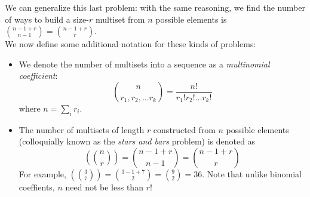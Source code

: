 \documentclass[11pt,twosided]{article}
\newcommand{\snb}[2]{\left(\binom{#1}{#2}\right)}
\begin{document}
\newline
We can generalize this last problem: with the same reasoning, we find the number of ways to build a size-$r$ multiset from $n$ possible elements is $\binom{n-1+r}{n-1} = \binom{n-1+r}{r}$. \\
We now define some additional notation for these kinds of problems: 
\begin{itemize}
\item We denote the number of multisets into a sequence as a \textit{multinomial coefficient}:
\[
	\binom{n}{r_1, r_2, \ldots r_k} = \frac{n!}{r_1! r_2! \ldots r_k!}
\]
where $n = \sum_i r_i$. 
\item The number of multisets of length $r$ constructed from $n$ possible elements (colloquially known as the \textit{stars and bars} problem) is denoted as 
\[
	\snb{n}{r} = \binom{n-1+r}{n-1} = \binom{n-1+r}{r}
\]
For example, $\snb{3}{7} = \binom{3-1+7}{2} = \binom{9}{2} = 36$. Note that unlike binomial coeffients, $n$ need not be less than $r$! 
\end{itemize}
\end{document}
